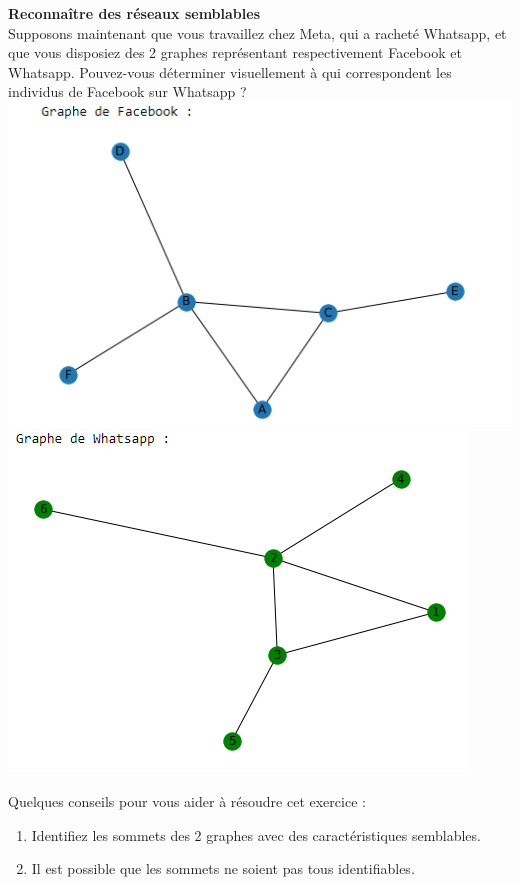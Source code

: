 \begin{Exercice}[5 minutes] \textbf{Reconnaître des réseaux semblables}\\
    Supposons maintenant que vous travaillez chez Meta, qui a racheté Whatsapp, et que vous disposiez des 2 graphes représentant respectivement Facebook et Whatsapp. Pouvez-vous déterminer visuellement à qui correspondent les individus de Facebook sur Whatsapp ?\\
    
    \includegraphics[]{resources/Network2.PNG}\\
    \includegraphics[]{resources/Network3.PNG}
    
    
    \begin{conseil}
    Quelques conseils pour vous aider à résoudre cet exercice :
    \begin{enumerate}
        \item Identifiez les sommets des 2 graphes avec des caractéristiques semblables.
        \item Il est possible que les sommets ne soient pas tous identifiables.
    \end{enumerate}
        

\end{conseil}
\end{Exercice}
